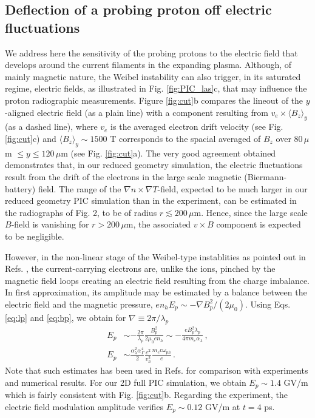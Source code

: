 \documentclass[aps,showpacs,superscriptaddress]{revtex4}
\begin{document}
\subsection{Deflection of a probing proton off electric fluctuations}
 We address here the sensitivity of the probing protons to the electric field that develops around the current filaments in the expanding plasma.
Although, of mainly magnetic nature, the Weibel instability can also trigger, in its saturated regime, electric fields, as illustrated in  Fig. \ref{fig:PIC_las}c, that may influence the proton radiographic measurements.
 Figure \ref{fig:cut}b compares the lineout of the  $y$-aligned electric field (as a plain line) with a component resulting from $v_{e}\times \langle B_{z}\rangle_y$ (as a dashed line), where $v_{e}$ is the averaged electron drift velocity (see Fig. \ref{fig:cut}c) and $\langle B_z\rangle_y \sim 1500$ T corresponds to the spacial averaged of $B_z$ over $80\,\mu$m $\le y\le 120\, \mu$m (see Fig. \ref{fig:cut}a).
 The very good agreement obtained demonstrates that, in our reduced geometry simulation, the electric  fluctuations result from the drift of the electrons  in the large scale magnetic (Biermann-battery) field.
The range of the $\nabla n\times \nabla T$-field, expected to be much larger  in our reduced geometry PIC simulation than in the experiment, can be estimated in the radiographs of  Fig. 2, to be of radius $r\lesssim 200\, \mu$m.
Hence, since the large scale $B$-field is   vanishing for  $r> 200\, \mu$m, the associated $v\times B$ component is expected to be negligible. 

However, in the non-linear stage of the Weibel-type instablities as pointed out in Refs. \cite{POP_Dieckmann_2009, POP_Bret_Gremillet_2010}, the current-carrying electrons  are,  unlike the ions,  pinched by the magnetic field loops creating an electric field  resulting from the charge imbalance. In first approximation, its amplitude  may be estimated by a balance between the electric field and  the  magnetic pressure, $en_hE_p \sim  - \nabla B_p^2/(2 \mu_0)$. 
Using Eqs. \eqref{eq:lp} and  \eqref{eq:bp}, we obtain  for $\nabla\equiv 2\pi/\lambda_p$
\begin{align}
E_p& \sim -  \frac{2\pi}{\lambda_p} \frac{B_p^2}{ 2\mu_0 e n_h }
\sim -  \frac{eB_p^2 \lambda_p}{  4\pi  m_e \alpha_\lambda} \, ,
 \label{eq:ep1}  \\
E_p& \sim \frac{\alpha_\lambda^2 \alpha_\Gamma^4}{2} \frac{c^2}{v_h^2} \frac{m_ec\omega_{ph}}{e  }   \label{eq:ep}
 \, .
\end{align}
Note that such estimates has been used  in Refs. \cite{POP_Dieckmann_2009,POP_Ruyer_2015,PRL_Gode_2017} for comparison with experiments and numerical results.  
For our 2D full PIC simulation, we obtain $E_p\sim 1.4 $ GV/m which is fairly consistent with Fig. \ref{fig:cut}b.  Regarding the experiment, the electric field modulation amplitude verifies  $E_p \sim 0.12$ GV/m at $t=4$ ps.
\end{document}
